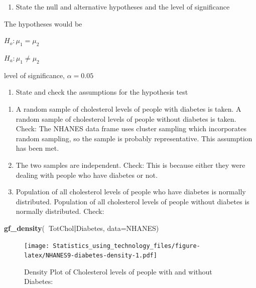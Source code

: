 \documentclass[
]{book}
\newenvironment{Shaded}{\begin{snugshade}}{\end{snugshade}}
\newcommand{\DataTypeTok}[1]{\textcolor[rgb]{0.13,0.29,0.53}{#1}}
\newcommand{\KeywordTok}[1]{\textcolor[rgb]{0.13,0.29,0.53}{\textbf{#1}}}
\newcommand{\NormalTok}[1]{#1}
\newcommand{\OperatorTok}[1]{\textcolor[rgb]{0.81,0.36,0.00}{\textbf{#1}}}
\providecommand{\tightlist}{%
  \setlength{\itemsep}{0pt}\setlength{\parskip}{0pt}}
\begin{document}
\begin{enumerate}
\def\labelenumi{\arabic{enumi}.}
\setcounter{enumi}{1}
\tightlist
\item
  State the null and alternative hypotheses and the level of significance
\end{enumerate}

The hypotheses would be

\(H_o: \mu_1=\mu_2\)

\(H_a: \mu_1 \ne \mu_2\)

level of significance, \(\alpha=0.05\)

\begin{enumerate}
\def\labelenumi{\arabic{enumi}.}
\setcounter{enumi}{2}
\tightlist
\item
  State and check the assumptions for the hypothesis test
\end{enumerate}

\begin{enumerate}
\def\labelenumi{\alph{enumi}.}
\item
  A random sample of cholesterol levels of people with diabetes is taken. A random sample of cholesterol levels of people without diabetes is taken. Check: The NHANES data frame uses cluster sampling which incorporates random sampling, so the sample is probably representative. This assumption has been met.
\item
  The two samples are independent. Check: This is because either they were dealing with people who have diabetes or not.
\item
  Population of all cholesterol levels of people who have diabetes is normally distributed. Population of all cholesterol levels of people without diabetes is normally distributed.
  Check:
\end{enumerate}



\begin{Shaded}
\begin{Highlighting}[]
\KeywordTok{gf_density}\NormalTok{(}\OperatorTok{~}\NormalTok{TotChol}\OperatorTok{|}\NormalTok{Diabetes, }\DataTypeTok{data=}\NormalTok{NHANES)}
\end{Highlighting}
\end{Shaded}

\begin{figure}
\centering
\texttt{[image: Statistics\_using\_technology\_files/figure-latex/NHANES9-diabetes-density-1.pdf]}
\caption{\label{fig:NHANES9-diabetes-density}Density Plot of Cholesterol levels of people with and without Diabetes:}
\end{figure}
\end{document}
